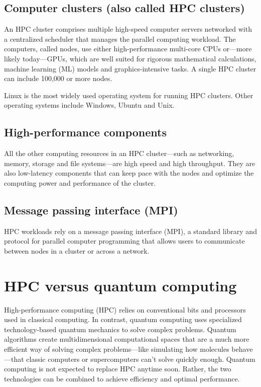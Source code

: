 \documentclass[11pt]{article}
\begin{document}
\subsection{Computer clusters (also called HPC clusters)}

An HPC cluster comprises multiple high-speed computer servers networked with a centralized scheduler that manages the parallel computing workload. The computers, called nodes, use either high-performance multi-core CPUs or—more likely today—GPUs, which are well suited for rigorous mathematical calculations, machine learning (ML) models and graphics-intensive tasks. A single HPC cluster can include 100{,}000 or more nodes.

Linux is the most widely used operating system for running HPC clusters. Other operating systems include Windows, Ubuntu and Unix.

\subsection{High-performance components}

All the other computing resources in an HPC cluster—such as networking, memory, storage and file systems—are high speed and high throughput. They are also low-latency components that can keep pace with the nodes and optimize the computing power and performance of the cluster.

\subsection{Message passing interface (MPI)}

HPC workloads rely on a message passing interface (MPI), a standard library and protocol for parallel computer programming that allows users to communicate between nodes in a cluster or across a network.

\section{HPC versus quantum computing}

High-performance computing (HPC) relies on conventional bits and processors used in classical computing. In contrast, quantum computing uses specialized technology-based quantum mechanics to solve complex problems. Quantum algorithms create multidimensional computational spaces that are a much more efficient way of solving complex problems—like simulating how molecules behave—that classic computers or supercomputers can't solve quickly enough. Quantum computing is not expected to replace HPC anytime soon. Rather, the two technologies can be combined to achieve efficiency and optimal performance.
\end{document}

